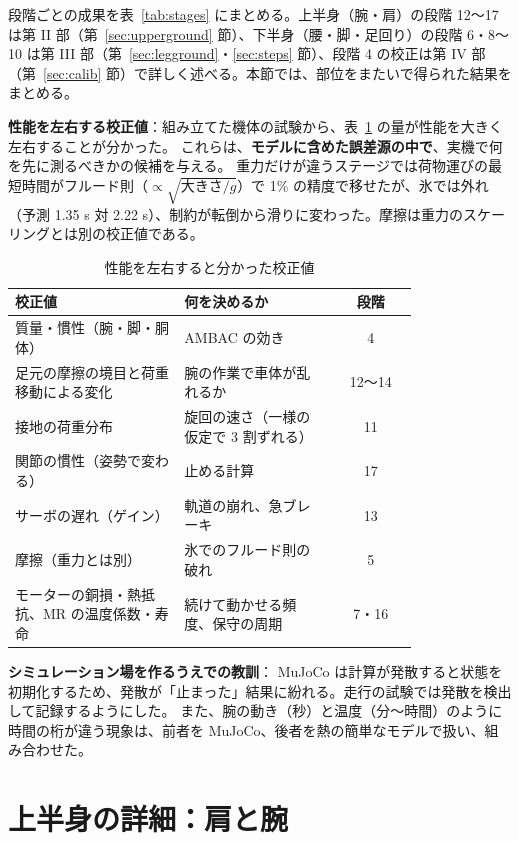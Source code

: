 \documentclass[paper=a4paper,fontsize=10pt,twocolumn,column_gap=2zw,line_length=24zw,number_of_lines=46,head_space=20mm]{jlreq}
\begin{document}
段階ごとの成果を表~\ref{tab:stages} にまとめる。上半身（腕・肩）の段階 12〜17 は第 II 部（第~\ref{sec:upperground} 節）、下半身（腰・脚・足回り）の段階 6・8〜10 は第 III 部（第~\ref{sec:legground}・\ref{sec:steps} 節）、段階 4 の校正は第 IV 部（第~\ref{sec:calib} 節）で詳しく述べる。本節では、部位をまたいで得られた結果をまとめる。

\textbf{性能を左右する校正値}：組み立てた機体の試験から、表~\ref{tab:calibvals} の量が性能を大きく左右することが分かった。
これらは、\textbf{モデルに含めた誤差源の中で}、実機で何を先に測るべきかの候補を与える。
重力だけが違うステージでは荷物運びの最短時間がフルード則（$\propto\sqrt{\text{大きさ}/g}$）で 1\% の精度で移せたが、氷では外れ（予測 1.35 s 対 2.22 s）、制約が転倒から滑りに変わった。摩擦は重力のスケーリングとは別の校正値である。

\begin{table}[t]\centering\small
\caption{性能を左右すると分かった校正値}\label{tab:calibvals}
\setlength{\tabcolsep}{3pt}
\begin{tabular}{p{0.42\linewidth}p{0.38\linewidth}c}\toprule
校正値 & 何を決めるか & 段階 \\\midrule
質量・慣性（腕・脚・胴体） & AMBAC の効き & 4 \\
足元の摩擦の境目と荷重移動による変化 & 腕の作業で車体が乱れるか & 12〜14 \\
接地の荷重分布 & 旋回の速さ（一様の仮定で 3 割ずれる） & 11 \\
関節の慣性（姿勢で変わる） & 止める計算 & 17 \\
サーボの遅れ（ゲイン） & 軌道の崩れ、急ブレーキ & 13 \\
摩擦（重力とは別） & 氷でのフルード則の破れ & 5 \\
モーターの銅損・熱抵抗、MR の温度係数・寿命 & 続けて動かせる頻度、保守の周期 & 7・16 \\\bottomrule
\end{tabular}
\end{table}

\textbf{シミュレーション場を作るうえでの教訓}：
MuJoCo は計算が発散すると状態を初期化するため、発散が「止まった」結果に紛れる。走行の試験では発散を検出して記録するようにした。
また、腕の動き（秒）と温度（分〜時間）のように時間の桁が違う現象は、前者を MuJoCo、後者を熱の簡単なモデルで扱い、組み合わせた。


\part{上半身の詳細：肩と腕}
\end{document}
